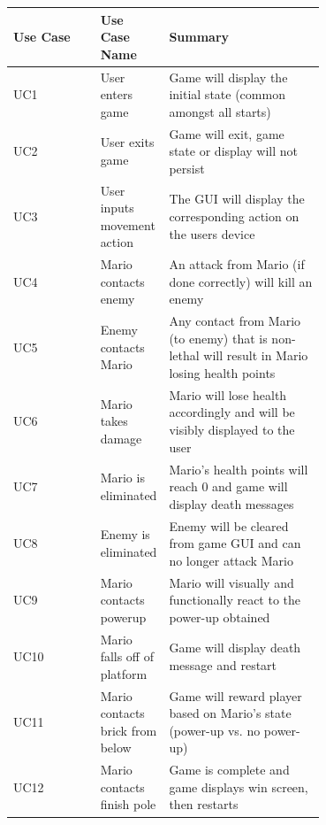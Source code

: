 \documentclass[12pt, titlepage]{article}
\begin{document}
\begin{longtable}{|l|p{0.2\linewidth}|p{0.5\linewidth}|}
\hline
\textbf{Use Case} & \textbf{Use Case Name}                   & \textbf{Summary}                                                                                        \\ \hline
\endfirsthead
%
\endhead
%
UC1      & User enters game                & Game will display the initial state (common amongst all starts)                                \\ \hline
UC2      & User exits game                 & Game will exit, game state or display will not persist                                         \\ \hline
UC3      & User inputs movement action     & The GUI will display the corresponding action on the users device                              \\ \hline
UC4      & Mario contacts enemy            & An attack from Mario (if done correctly) will kill an enemy                                    \\ \hline
UC5      & Enemy contacts Mario            & Any contact from Mario (to enemy) that is non-lethal will result in Mario losing health points \\ \hline
UC6      & Mario takes damage              & Mario will lose health accordingly and will be visibly displayed to the user                   \\ \hline
UC7      & Mario is eliminated             & Mario's health points will reach 0 and game will display death messages                        \\ \hline
UC8      & Enemy is eliminated             & Enemy will be cleared from game GUI and can no longer attack Mario                             \\ \hline
UC9      & Mario contacts powerup          & Mario will visually and functionally react to the power-up obtained                            \\ \hline
UC10     & Mario falls off of platform     & Game will display death message and restart                                                    \\ \hline
UC11     & Mario contacts brick from below & Game will reward player based on Mario's state (power-up vs. no power-up)                      \\ \hline
UC12     & Mario contacts finish pole      & Game is complete and game displays win screen, then restarts                                   \\ \hline
\end{longtable}
\end{document}
